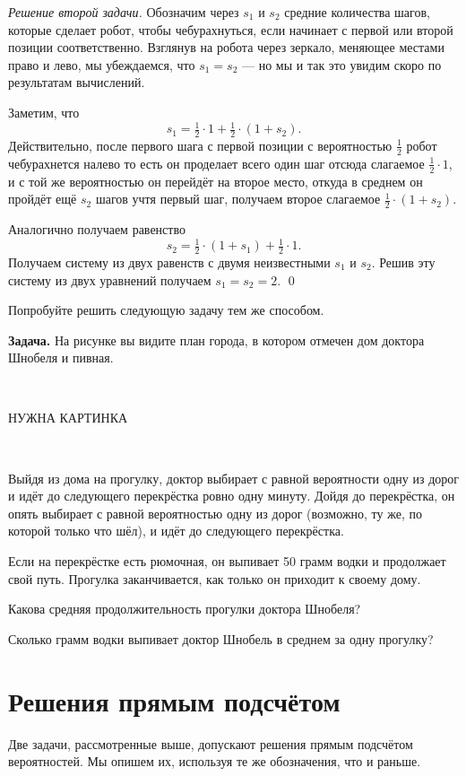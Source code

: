 \documentclass{article}
\begin{document}
\medskip
\noindent\textit{Решение второй задачи.}
Обозначим через $s_1$ и $s_2$ средние количества шагов, которые сделает робот, чтобы чебурахнуться,
если начинает с первой или второй позиции соответственно.
Взглянув на робота через зеркало, меняющее местами право и лево, мы убеждаемся, что $s_1=s_2$ --- но мы и так это увидим скоро по результатам вычислений.

Заметим, что 
\[s_1=\tfrac12\cdot1+\tfrac12\cdot (1+s_2).\]
Действительно, после первого шага с первой позиции
с вероятностью $\tfrac12$ робот чебурахнется налево то есть он проделает всего один шаг
отсюда слагаемое $\tfrac12\cdot1$,
и с той же вероятностью он перейдёт на второе место,
откуда в среднем он пройдёт ещё $s_2$ шагов
учтя первый шаг, получаем второе слагаемое $\tfrac12\cdot (1+s_2)$.

Аналогично получаем равенство
\[s_2=\tfrac12\cdot (1+s_1)+\tfrac12\cdot 1.\]
Получаем систему из двух равенств с двумя неизвестными $s_1$ и $s_2$.
Решив эту систему из двух уравнений получаем 
$s_1=s_2=2$.
\qed
\medskip

Попробуйте решить следующую задачу тем же способом.

\medskip
\noindent\textbf{Задача.}
На рисунке вы видите план города, в котором отмечен дом доктора
Шнобеля и пивная.

\ 

НУЖНА КАРТИНКА

\ 

Выйдя из дома на прогулку, доктор выбирает с равной вероятности 
одну из дорог и идёт до следующего перекрёстка ровно одну минуту.
Дойдя до перекрёстка, он опять выбирает с равной вероятностью 
одну из дорог (возможно, ту же, по которой только что шёл), 
и идёт до следующего перекрёстка.

Если на перекрёстке есть рюмочная, 
он выпивает 50 грамм водки и продолжает свой путь.
Прогулка заканчивается, как только он приходит к своему дому.

Какова средняя продолжительность прогулки доктора Шнобеля?

Сколько грамм водки выпивает доктор Шнобель в среднем за одну прогулку? 

\section{Решения прямым подсчётом}

Две задачи, рассмотренные выше, допускают решения прямым подсчётом вероятностей. 
Мы опишем их, используя те же обозначения, что и раньше.
\end{document}

